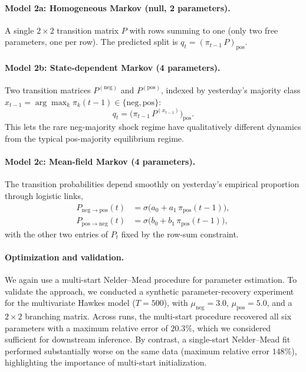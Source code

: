 \documentclass[11pt]{article}
\newcommand{\pipos}{\pi_{\mathrm{pos}}}
\begin{document}
\paragraph{Model 2a: Homogeneous Markov (null, 2 parameters).}
A single $2{\times}2$ transition matrix $P$ with rows summing to one
(only two free parameters, one per row). The predicted split is
$q_t=(\pi_{t-1}\,P)_{\mathrm{pos}}$.

\paragraph{Model 2b: State-dependent Markov (4 parameters).}
Two transition matrices $P^{(\mathrm{neg})}$ and $P^{(\mathrm{pos})}$,
indexed by yesterday's majority class
$x_{t-1}=\arg\max_k\pi_k(t-1)\in\{\mathrm{neg},\mathrm{pos}\}$:
\begin{equation}
  q_t = \bigl(\pi_{t-1}\, P^{(x_{t-1})}\bigr)_{\mathrm{pos}}.
\end{equation}
This lets the rare neg-majority shock regime have qualitatively different
dynamics from the typical pos-majority equilibrium regime.

\paragraph{Model 2c: Mean-field Markov (4 parameters).}
The transition probabilities depend smoothly on yesterday's empirical
proportion through logistic links,
\begin{align}
  P_{\mathrm{neg}\to\mathrm{pos}}(t) &= \sigma\bigl(a_0 + a_1\,\pipos(t-1)\bigr),
   \\
  P_{\mathrm{pos}\to\mathrm{neg}}(t) &= \sigma\bigl(b_0 + b_1\,\pipos(t-1)\bigr),
\end{align}
with the other two entries of $P_t$ fixed by the row-sum constraint.

\paragraph{Optimization and validation.}
We again use a multi-start Nelder--Mead procedure for parameter estimation.
To validate the approach, we conducted a synthetic parameter-recovery experiment
for the multivariate Hawkes model ($T=500$), with
$\mu_{\mathrm{neg}}=3.0$, $\mu_{\mathrm{pos}}=5.0$, and a $2\times2$
branching matrix. Across runs, the multi-start procedure recovered all six
parameters with a maximum relative error of $20.3\%$, which we considered
sufficient for downstream inference. By contrast, a single-start Nelder--Mead
fit performed substantially worse on the same data (maximum relative error
$148\%$), highlighting the importance of multi-start initialization.
\end{document}
